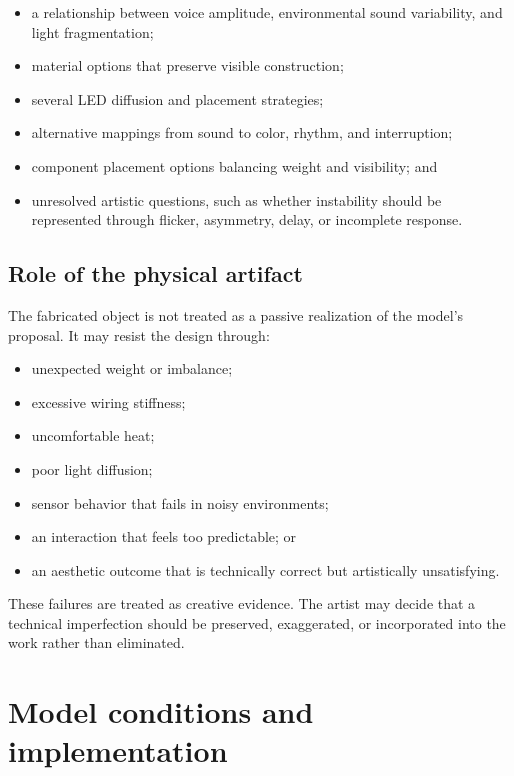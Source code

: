 \documentclass{article}
\begin{document}
\begin{itemize}[leftmargin=*]
    \item a relationship between voice amplitude, environmental sound
    variability, and light fragmentation;
    \item material options that preserve visible construction;
    \item several LED diffusion and placement strategies;
    \item alternative mappings from sound to color, rhythm, and interruption;
    \item component placement options balancing weight and visibility; and
    \item unresolved artistic questions, such as whether instability should be
    represented through flicker, asymmetry, delay, or incomplete response.
\end{itemize}

\subsection{Role of the physical artifact}

The fabricated object is not treated as a passive realization of the model's
proposal. It may resist the design through:

\begin{itemize}[leftmargin=*]
    \item unexpected weight or imbalance;
    \item excessive wiring stiffness;
    \item uncomfortable heat;
    \item poor light diffusion;
    \item sensor behavior that fails in noisy environments;
    \item an interaction that feels too predictable; or
    \item an aesthetic outcome that is technically correct but artistically
    unsatisfying.
\end{itemize}

These failures are treated as creative evidence. The artist may decide that a
technical imperfection should be preserved, exaggerated, or incorporated into
the work rather than eliminated.

\section{Model conditions and implementation}
\end{document}
